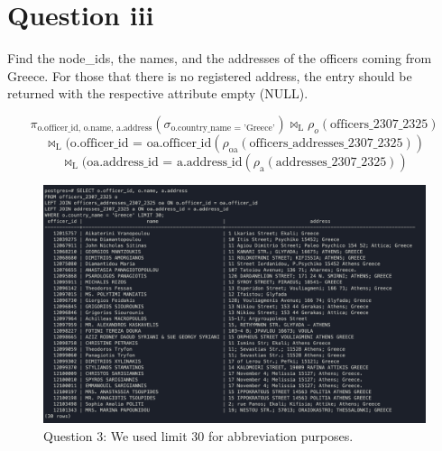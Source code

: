 \documentclass{article}
\begin{document}
\newpage

\section*{Question iii}
Find the node\_ids, the names, and the addresses of the officers coming from Greece. For those that there is no registered address, the entry should be returned with the respective attribute empty (NULL).

\[
    \pi_{\text{{o.officer\_id, o.name, a.address}}}(\sigma_{\text{{o.country\_name = 'Greece'}}}) \bowtie_{\text{L}}\rho_o(\text{{officers\_2307\_2325}})
\]
\[
    \bowtie_{\text{L}}({\text{{o.officer\_id = oa.officer\_id}}}  (\text{{\(\rho_{\text{{oa}}}(\text{{officers\_addresses\_2307\_2325}})\)}})
\]
\[
    \bowtie_{\text{L}}({\text{{oa.address\_id = a.address\_id}}}(\rho_{\text{{a}}}(\text{{addresses\_2307\_2325}}))
\]




\begin{figure}[h]
    \centering
    \includegraphics[width=1\linewidth]{Q3.png}
    \captionsetup{labelformat=empty}
    \caption{Question 3: We used limit 30 for abbreviation purposes.}
\end{figure}

\newpage
\end{document}
